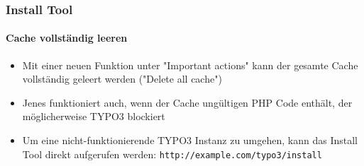 
\begin{frame}[fragile]
	\frametitle{Install Tool}
	\framesubtitle{Cache vollständig leeren}

	\begin{itemize}
		\item Mit einer neuen Funktion unter "Important actions" kann der gesamte Cache vollständig geleert werden ("Delete all cache")
		\item Jenes funktioniert auch, wenn der Cache ungültigen PHP Code enthält, der möglicherweise TYPO3 blockiert
		\item Um eine nicht-funktionierende TYPO3 Instanz zu umgehen, kann das Install Tool direkt aufgerufen werden: \texttt{http://example.com/typo3/install}
	\end{itemize}


\end{frame}
